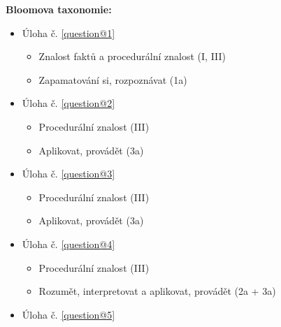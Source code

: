 \documentclass[12pt,a4paper,addpoints]{exam}
\begin{document}
\begin{titlepage}
\begin{center}
                \normalsize
                \textbf{Bloomova taxonomie:}
                        \vspace{-5mm}
                        \footnotesize
                        \begin{itemize}[noitemsep,topsep=0pt]
                        \item Úloha č. \ref{question@1}\\
                                \begin{itemize}[noitemsep,topsep=0pt]
                                        \item Znalost faktů a procedurální znalost (I, III)
                                        \item Zapamatování si, rozpoznávat (1a)
                                \end{itemize}
                        \item Úloha č. \ref{question@2}\\
                                \begin{itemize}[noitemsep,topsep=0pt]
                                        \item Procedurální znalost (III)
                                        \item Aplikovat, provádět (3a)
                                \end{itemize}
                        \item Úloha č. \ref{question@3}\\
                                \begin{itemize}[noitemsep,topsep=0pt]
                                        \item Procedurální znalost (III)
                                        \item Aplikovat, provádět (3a)
                                \end{itemize}
                        \item Úloha č. \ref{question@4}\\
                                \begin{itemize}[noitemsep,topsep=0pt]
                                        \item Procedurální znalost (III)
                                        \item Rozumět, interpretovat a aplikovat, provádět (2a + 3a)
                                \end{itemize}
                        \item Úloha č. \ref{question@5}\\

\end{itemize}
\end{center}
\end{titlepage}
\end{document}
